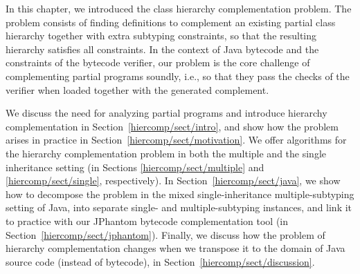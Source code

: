 In this chapter, we introduced the class hierarchy complementation
problem. The problem consists of finding definitions to complement an
existing partial class hierarchy together with extra subtyping
constraints, so that the resulting hierarchy satisfies all
constraints. In the context of Java bytecode and the constraints of
the bytecode verifier, our problem is the core challenge of
complementing partial programs soundly, i.e., so that they pass the
checks of the verifier when loaded together with the generated
complement.

We discuss the need for analyzing partial programs and introduce
hierarchy complementation in Section~\ref{hiercomp/sect/intro}, and show how
the problem arises in practice in Section~\ref{hiercomp/sect/motivation}.
%
We offer algorithms for the hierarchy complementation problem in
both the multiple and the single inheritance setting (in Sections
\ref{hiercomp/sect/multiple} and \ref{hiercomp/sect/single}, respectively).
%
In Section~\ref{hiercomp/sect/java}, we show how to decompose the problem
in the mixed single-inheritance multiple-subtyping setting of Java,
into separate single- and multiple-subtyping instances, and link it
to practice with our JPhantom bytecode complementation tool (in
Section~\ref{hiercomp/sect/jphantom}).
%
Finally, we discuss how the problem of hierarchy complementation
changes when we transpose it to the domain of Java source code
(instead of bytecode), in Section~\ref{hiercomp/sect/discussion}.


